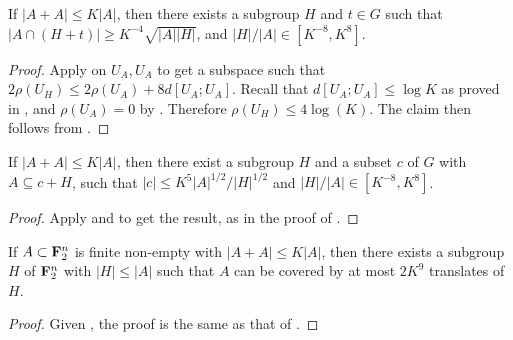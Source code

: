 \begin{corollary}\label{pfr-9-aux}\leanok
If $|A+A| \leq K|A|$, then there exists a subgroup $H$ and $t\in G$ such that
$|A \cap (H+t)| \geq K^{-4} \sqrt{|A||H|}$, and $|H|/|A|\in[K^{-8},K^8]$.
\end{corollary}

\begin{proof}\leanok
  Apply  on $U_A,U_A$ to get a subspace such that $2\rho(U_H)\le 2\rho(U_A)+8d[U_A;U_A]$. Recall that $d[U_A;U_A]\le \log K$ as proved in , and $\rho(U_A)=0$ by . Therefore $\rho(U_H)\le 4\log(K)$. The claim then follows from .
\end{proof}


\begin{corollary}\label{pfr-9-aux'}\leanok
If $|A+A| \leq K|A|$, then there exist a subgroup $H$ and a subset $c$ of $G$
with $A \subseteq c + H$, such that $|c| \leq K^{5} |A|^{1/2}/|H|^{1/2}$ and
$|H|/|A|\in[K^{-8},K^8]$.
\end{corollary}

\begin{proof}\leanok
Apply  and  to get the result, as in the proof
of .
\end{proof}


\begin{theorem}[PFR with \texorpdfstring{$C=9$}{C=9}]\label{pfr-9}\leanok  If $A \subset {\bf F}_2^n$ is finite non-empty with $|A+A| \leq K|A|$, then there exists a subgroup $H$ of ${\bf F}_2^n$ with $|H| \leq |A|$ such that $A$ can be covered by at most $2K^9$ translates of $H$.
\end{theorem}

\begin{proof}\leanok
Given , the proof is the same as that of .
\end{proof}
